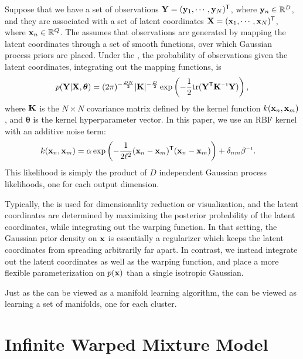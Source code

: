 Suppose that we have a set of observations
$\mathbf{Y} = ({\bf{y}}_1,\cdots,{\bf{y}}_N)^{\mathsf{T}}$,
where ${\bf{y}}_n \in {\mathbb R}^D$,
and they are associated with a set of latent coordinates
$\mathbf{X} = ({\bf{x}}_1,\cdots,{\bf{x}}_{N})^{\mathsf{T}}$,
where ${\bf{x}}_n \in {\mathbb R}^Q$.
The \gplvm{} assumes that observations are generated by mapping the latent coordinates through a set of smooth functions, over which Gaussian process priors are placed.
Under the \gplvm{}, the probability of observations given the latent coordinates, integrating out the mapping functions, is
\begin{align}
p(\vY | \vX,\bm{\theta})  = (2 \pi)^{-\frac{DN}{2}}  |\vK|^{-\frac{D}{2}} \exp \left( -\frac{1}{2} {\rm tr}( \vY\tra \vK\inv \vY) \right),
\label{eq:py_x}
\end{align}
where $\mathbf{K}$ is the $N \times N$ covariance matrix defined 
by the kernel function $k({\bf{x}}_{n},{\bf{x}}_{m})$,
and $\bm{\theta}$ is the kernel hyperparameter vector.
In this paper, we use an RBF kernel with an additive noise term:
\begin{align}
k(\vx_{n},\vx_{m}) &= \alpha \exp\left( - \frac{1}{2 \ell^2}(\vx_n - \vx_m)\tra (\vx_n - \vx_m) \right) 
+ \delta_{nm} \beta\inv.
\end{align}
This likelihood is simply the product of $D$ independent Gaussian process likelihoods, one for each output dimension.

Typically, the \gplvm{} is used for dimensionality reduction or visualization, and the latent coordinates are determined by maximizing the posterior probability of the latent coordinates, while integrating out the warping function.  
In that setting, the Gaussian prior density on ${\bf{x}}$ is essentially a regularizer which keeps the latent coordinates from spreading arbitrarily far apart.  
In contrast, we instead integrate out the latent coordinates as well as the warping function, and place a more flexible parameterization on $p({\bf{x}})$ than a single isotropic Gaussian.

Just as the \gplvm{} can be viewed as a manifold learning algorithm, the \iwmm{} can be viewed as learning a set of manifolds, one for each cluster.





\section{Infinite Warped Mixture Model}

